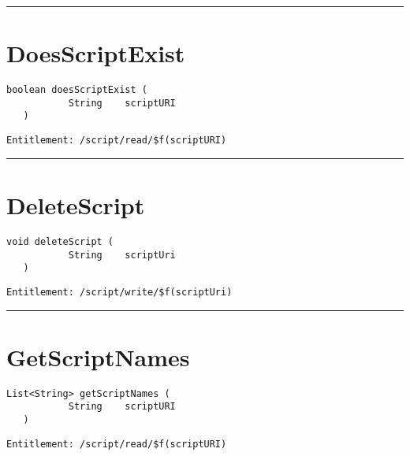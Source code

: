 \rule{12cm}{2pt}
\section{DoesScriptExist}
\label{Api:DoesScriptExist}
\begin{lstlisting}[style=nonumbers]
   boolean doesScriptExist (
           String    scriptURI
   )
\end{lstlisting}
\begin{Verbatim}[formatcom=\color{Maroon}]
  Entitlement: /script/read/$f(scriptURI)
\end{Verbatim}



\rule{12cm}{2pt}
\section{DeleteScript}
\label{Api:DeleteScript}
\begin{lstlisting}[style=nonumbers]
   void deleteScript (
           String    scriptUri
   )
\end{lstlisting}
\begin{Verbatim}[formatcom=\color{Maroon}]
  Entitlement: /script/write/$f(scriptUri)
\end{Verbatim}



\rule{12cm}{2pt}
\section{GetScriptNames}
\label{Api:GetScriptNames}
\begin{lstlisting}[style=nonumbers]
   List<String> getScriptNames (
           String    scriptURI
   )
\end{lstlisting}
\begin{Verbatim}[formatcom=\color{Maroon}]
  Entitlement: /script/read/$f(scriptURI)
\end{Verbatim}



